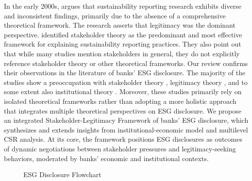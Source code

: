 \documentclass[
  authoryear]{elsarticle}
\makeatletter
\newcommand*\pandocbounded[1]{%
  \sbox\pandoc@box{#1}%
  \Gscale@div\@tempa{\textheight}{\dimexpr\ht\pandoc@box+\dp\pandoc@box\relax}%
  \Gscale@div\@tempb{\linewidth}{\wd\pandoc@box}%
  \ifdim\@tempb\p@<\@tempa\p@\let\@tempa\@tempb\fi%
  \ifdim\@tempa\p@<\p@\scalebox{\@tempa}{\usebox\pandoc@box}%
  \else\usebox{\pandoc@box}%
  \fi%
}
\makeatother
\begin{document}
In the early 2000s, \citet{HOOGHIEMSTRA2000} argues that sustainability
reporting research exhibits diverse and inconsistent findings, primarily
due to the absence of a comprehensive theoretical framework. The
research asserts that legitimacy was the dominant perspective.
\citet{SPENCE2010} identified stakeholder theory as the predominant and
most effective framework for explaining sustainability reporting
practices. They also point out that while many studies mention
stakeholders in general, they do not explicitly reference stakeholder
theory or other theoretical frameworks. Our review confirms their
observations in the literature of banks' ESG disclosure. The majority of
the studies show a preoccupation with stakeholder theory
\citep{GALANT2017, SHEN2016, BUALLAY2021}, legitimacy theory
\citep[e.g.][]{CARNEVALE2014}, and to some extent also institutional
theory \citep{HIGGINS2014, BEBBINGTON2018, CHRISTENSEN2021}. Moreover,
these studies primarily rely on isolated theoretical frameworks rather
than adopting a more holistic approach that integrates multiple
theoretical perspectives on ESG disclosure. We propose an integrated
Stakeholder-Legitimacy Framework of banks' ESG disclosure, which
synthesizes and extends insights from \citet{CAMPBELL2007}
institutional-economic model and \citet{AGUINIS2012} multilevel CSR
analysis. At its core, the framework positions ESG disclosures as
outcomes of dynamic negotiations between stakeholder pressures and
legitimacy-seeking behaviors, moderated by banks' economic and
institutional contexts.

\begin{figure}

\centering{

\pandocbounded{\texttt{[image: flowchart.pdf]}}

}

\caption{\label{fig-flowchart}ESG Disclosure Flowchart}

\end{figure}%
\end{document}
